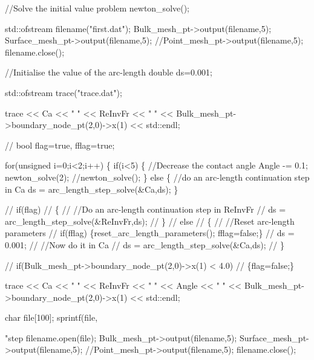 \begin{DoxyCodeInclude}
 \textcolor{comment}{//Solve the initial value problem}
 newton\_solve();

 std::ofstream filename(\textcolor{stringliteral}{"first.dat"}); 
 Bulk\_mesh\_pt->output(filename,5); 
 Surface\_mesh\_pt->output(filename,5); 
 \textcolor{comment}{//Point\_mesh\_pt->output(filename,5);}
 filename.close();

 \textcolor{comment}{//Initialise the value of the arc-length}
 \textcolor{keywordtype}{double} ds=0.001;
 
 std::ofstream trace(\textcolor{stringliteral}{"trace.dat"});

 trace << Ca << \textcolor{stringliteral}{" "} << ReInvFr << \textcolor{stringliteral}{" "}
       << Bulk\_mesh\_pt->boundary\_node\_pt(2,0)->x(1) << std::endl;

\textcolor{comment}{// bool flag=true, fflag=true;}

 \textcolor{keywordflow}{for}(\textcolor{keywordtype}{unsigned} i=0;i<2;i++)
  \{
   \textcolor{keywordflow}{if}(i<5)
    \{
     \textcolor{comment}{//Decrease the contact angle}
     Angle -= 0.1;
     newton\_solve(2);
     \textcolor{comment}{//newton\_solve();}
    \}
   \textcolor{keywordflow}{else}
    \{
     \textcolor{comment}{//do an arc-length continuation step in Ca}
     ds = arc\_length\_step\_solve(&Ca,ds);
    \}

  \textcolor{comment}{//  if(flag)}
\textcolor{comment}{//     \{}
\textcolor{comment}{//      //Do an arc-length continuation step in ReInvFr}
\textcolor{comment}{//      ds = arc\_length\_step\_solve(&ReInvFr,ds);}
\textcolor{comment}{//     \}}
\textcolor{comment}{//    else}
\textcolor{comment}{//     \{}
\textcolor{comment}{//      //Reset arc-length parameters}
\textcolor{comment}{//      if(fflag) \{reset\_arc\_length\_parameters(); fflag=false;\}}
\textcolor{comment}{//      ds = 0.001;}
\textcolor{comment}{//      //Now do it in Ca}
\textcolor{comment}{//      ds = arc\_length\_step\_solve(&Ca,ds);}
\textcolor{comment}{//     \}}

\textcolor{comment}{//    if(Bulk\_mesh\_pt->boundary\_node\_pt(2,0)->x(1) < 4.0)}
\textcolor{comment}{//     \{flag=false;\}}

   trace << Ca << \textcolor{stringliteral}{" "} << ReInvFr << \textcolor{stringliteral}{" "} << Angle << \textcolor{stringliteral}{" "}
         << Bulk\_mesh\_pt->boundary\_node\_pt(2,0)->x(1) << std::endl;   
   
   \textcolor{keywordtype}{char} file[100];
   sprintf(file,\textcolor{stringliteral}{"step%
   filename.open(file);
   Bulk\_mesh\_pt->output(filename,5);
   Surface\_mesh\_pt->output(filename,5);
   \textcolor{comment}{//Point\_mesh\_pt->output(filename,5);}
   filename.close();

}
\end{DoxyCodeInclude}
